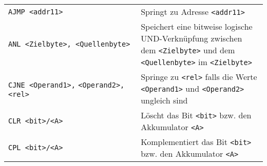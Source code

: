 \begin{longtable}[c]{@{}ll@{}}
\begin{minipage}[t]{0.25\columnwidth}
\texttt{AJMP\ \textless{}addr11\textgreater{}}
\strut\end{minipage} &
\begin{minipage}[t]{0.69\columnwidth}\raggedright\strut
Springt zu Adresse \texttt{\textless{}addr11\textgreater{}}
\strut\end{minipage}\tabularnewline
\begin{minipage}[t]{0.25\columnwidth}\raggedright\strut
\texttt{ANL\ \textless{}Zielbyte\textgreater{},\ \textless{}Quellenbyte\textgreater{}}
\strut\end{minipage} &
\begin{minipage}[t]{0.69\columnwidth}\raggedright\strut
Speichert eine bitweise logische UND-Verknüpfung zwischen dem
\texttt{\textless{}Zielbyte\textgreater{}} und dem
\texttt{\textless{}Quellenbyte\textgreater{}} im
\texttt{\textless{}Zielbyte\textgreater{}}
\strut\end{minipage}\tabularnewline
\begin{minipage}[t]{0.25\columnwidth}\raggedright\strut
\texttt{CJNE\ \textless{}Operand1\textgreater{},}
\texttt{\textless{}Operand2\textgreater{},\textless{}rel\textgreater{}}
\strut\end{minipage} &
\begin{minipage}[t]{0.69\columnwidth}\raggedright\strut
Springe zu \texttt{\textless{}rel\textgreater{}} falls die Werte
\texttt{\textless{}Operand1\textgreater{}} und
\texttt{\textless{}Operand2\textgreater{}} ungleich sind
\strut\end{minipage}\tabularnewline
\begin{minipage}[t]{0.25\columnwidth}\raggedright\strut
\texttt{CLR\ \textless{}bit\textgreater{}/\textless{}A\textgreater{}}
\strut\end{minipage} &
\begin{minipage}[t]{0.69\columnwidth}\raggedright\strut
Löscht das Bit \texttt{\textless{}bit\textgreater{}} bzw. den
Akkumulator \texttt{\textless{}A\textgreater{}}
\strut\end{minipage}\tabularnewline
\begin{minipage}[t]{0.25\columnwidth}\raggedright\strut
\texttt{CPL\ \textless{}bit\textgreater{}/\textless{}A\textgreater{}}
\strut\end{minipage} &
\begin{minipage}[t]{0.69\columnwidth}\raggedright\strut
Komplementiert das Bit \texttt{\textless{}bit\textgreater{}} bzw. den
Akkumulator \texttt{\textless{}A\textgreater{}}
\strut\end{minipage}\tabularnewline

\end{longtable}
